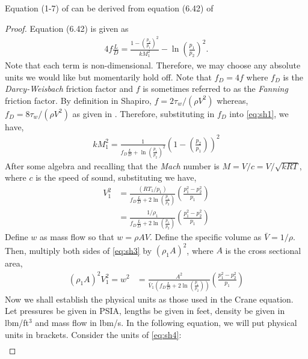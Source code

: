 \documentclass{psig_required_latex_files/psig}
\begin{document}
\begin{lemma}
Equation (1-7) of \cite{crane1980flow} can be derived from equation (6.42) of \cite{shapiro1953dynamics}
\end{lemma}
\begin{proof}
Equation (6.42) is given as
\begin{align}\label{eq:sh1}
4f\frac{L}{D} = \frac{1 - \left(\frac{p_2}{p_1} \right)^2}{kM_1^2} - \ln\left(\frac{p_1}{p_2} \right)^2.
\end{align}
Note that each term is non-dimensional.  Therefore, we may choose any absolute units we would like but momentarily hold off.  Note that $f_D = 4f$ where $f_D$ is the \emph{Darcy-Weisbach} friction factor and $f$ is sometimes referred to as the \emph{Fanning} friction factor.  By definition in Shapiro, $f = 2\tau_w / (\rho V^2)$ whereas, $f_D = 8 \tau_w/(\rho V^2)$ as given in \cite[Chapter 9]{FFM}.  Therefore, substituting in $f_D$ into \ref{eq:sh1}, we have,
\begin{align}\label{eq:sh2}
kM_1^2 = \frac{1}{f_D\frac{L}{D} + \ln\left(\frac{p_1}{p_2} \right)^2}\left(1 - \left(\frac{p_2}{p_1} \right)\right)^2
\end{align}
After some algebra and recalling that the \emph{Mach} number is $M = V/c = V/\sqrt{k R T}$, where $c$ is the speed of sound, substituting we have,
\begin{align}\label{eq:sh3}
V_1^2 &= \frac{(R T_1/p_1)}{f_D\frac{L}{D} + 2\ln\left(\frac{p_1}{p_2} \right)} \left(\frac{p_1^2 - p_2^2}{p_1} \right) \\
&= \frac{1/\rho_1}{f_D\frac{L}{D} + 2\ln\left(\frac{p_1}{p_2} \right)} \left(\frac{p_1^2 - p_2^2}{p_1} \right)
\end{align}
Define $w$ as mass flow so that $w=\rho A V$.  Define the specific volume as $\bar V = 1/\rho$.  Then, multiply both sides of \eqref{eq:sh3} by $(\rho_1 A)^2$, where $A$ is the cross sectional area,
\begin{align}\label{eq:sh4}
(\rho_1 A)^2 V_1^2 = w^2 &= \frac{A^2}{\bar V_1 \left(f_D\frac{L}{D} + 2\ln\left(\frac{p_1}{p_2} \right)\right)} \left(\frac{p_1^2 - p_2^2}{p_1} \right)
\end{align}
Now we shall establish the physical units as those used in the Crane equation.  Let pressures be given in PSIA, lengths be given in feet, density be given in lbm/ft$^3$ and mass flow in lbm/s.  In the following equation, we will put physical units in brackets. Consider the units of \eqref{eq:sh4}:
\begin{align}\label{eq:sh5}

\end{align}
\end{proof}
\end{document}
